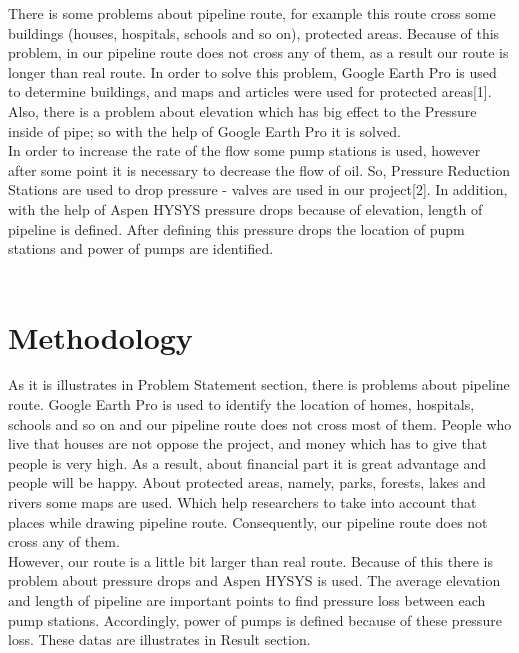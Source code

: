 \documentclass[12pt]{article}
\begin{document}
{\fontsize{12pt}{12pt}\selectfont  

\hspace*{1em}There is some problems about pipeline route, for example this route cross some buildings (houses, hospitals, schools and so on), protected areas. Because of this problem, in our pipeline route does not cross any of them, as a result our route is longer than real route. In order to solve this problem, Google Earth Pro is used to determine buildings, and maps and articles were used for protected areas[1]. Also, there is a problem about elevation which has big effect to the Pressure inside of pipe; so with the help of Google Earth Pro it is solved.
\\

In order to increase the rate of the flow some pump stations is used, however after some point it is necessary to decrease the flow of oil. So, Pressure Reduction Stations are used to drop pressure -  valves are used in our project[2].  In addition, with the help of Aspen HYSYS pressure drops because of elevation, length of pipeline is defined. After defining this pressure drops the location of pupm stations and power of pumps are identified.
\\
\\

}

\section*{Methodology}

{\fontsize{12pt}{12pt}\selectfont  
\hspace*{1em} As it is illustrates in Problem Statement section, there is problems about pipeline route. Google Earth Pro is used to identify the location of homes, hospitals, schools and so on and our pipeline route does not cross most of them. People who live that houses are not oppose the project, and money which has to give that people is very high. As a result, about financial part it is great advantage and people will be happy. About protected areas, namely, parks, forests, lakes and rivers some maps are used. Which help researchers to take into account that places while drawing pipeline route. Consequently, our pipeline route does not cross any of them.
\\

However, our route is a little bit larger than real route. Because of this there is problem about pressure drops and Aspen HYSYS is used. The average elevation and length of pipeline are important points to find pressure loss between each pump stations. Accordingly, power of pumps is defined because of these pressure loss. These datas are illustrates in Result section. 
\\


}
\end{document}
